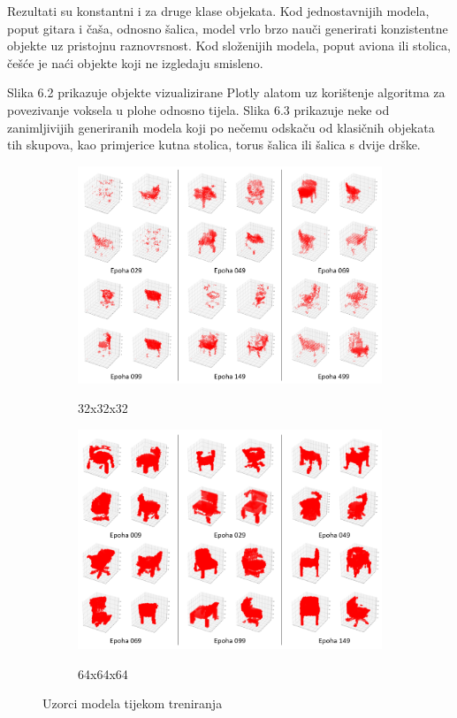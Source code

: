 \documentclass[times, utf8, diplomski]{fer}
\begin{document}
Rezultati su konstantni i za druge klase objekata. Kod jednostavnijih modela, poput gitara i čaša, odnosno šalica, model vrlo brzo nauči generirati konzistentne objekte uz pristojnu raznovrsnost. Kod složenijih modela, poput aviona ili stolica, češće je naći objekte koji ne izgledaju smisleno.

Slika 6.2 prikazuje objekte vizualizirane Plotly alatom uz korištenje algoritma za povezivanje voksela u plohe odnosno tijela. Slika 6.3 prikazuje neke od zanimljivijih generiranih modela koji po nečemu odskaču od klasičnih objekata tih skupova, kao primjerice kutna stolica, torus šalica ili šalica s dvije drške.

\begin{figure}
\centering
\begin{subfigure}[b]{1\textwidth}
   \includegraphics[width=1\linewidth]{32_200.png}
   \label{fig:Ng1} 
    \caption{32x32x32}
\end{subfigure}

\begin{subfigure}[b]{1\textwidth}
   \includegraphics[width=1\linewidth]{64_400.png}
   \label{fig:Ng2}
   \caption{64x64x64}
\end{subfigure}
\caption{Uzorci modela tijekom treniranja}
\end{figure}
\end{document}
